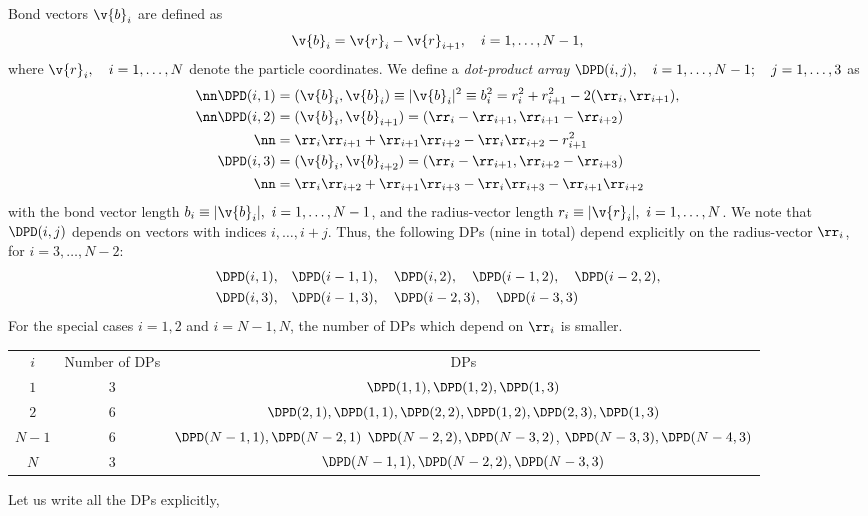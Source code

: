Bond vectors $\v{b}_i$ are defined as 
\begin{equation}
  \v{b}_i=\v{r}_i-\v{r}_{i+1},\quad i=1,\ldots,N-1,
  \label{bln-def-bv}
\end{equation}
where $\v{r}_i,\quad i=1,\ldots,N$ denote the particle coordinates. We define
a \emph{dot-product array} $\DPD(i,j),\quad i=1,\ldots, N-1;\quad j=1,\ldots,3$ as
\begin{align}
  \nn\DPD(i,1)&=(\v{b}_i,\v{b}_i)\equiv |\v{b}_i|^2\equiv b_i^2=r_i^2+r_{i+1}^2-2(\rr_i,\rr_{i+1}),\\
  \nn\DPD(i,2)&=(\v{b}_i,\v{b}_{i+1})=(\rr_i-\rr_{i+1},\rr_{i+1}-\rr_{i+2})\\
\nn&=\rr_i\rr_{i+1}+\rr_{i+1}\rr_{i+2}-\rr_i\rr_{i+2}-r_{i+1}^2\\
  \DPD(i,3)&=(\v{b}_i,\v{b}_{i+2})=(\rr_i-\rr_{i+1},\rr_{i+2}-\rr_{i+3})\\
\nn&=\rr_i\rr_{i+2}+\rr_{i+1}\rr_{i+3}-\rr_{i}\rr_{i+3}-\rr_{i+1}\rr_{i+2}
  \label{bln-def-dpd}
\end{align}
with the bond vector length $b_i\equiv|\v{b}_i|,\ i=1,\ldots,N-1$, 
and the radius-vector length $r_i\equiv|\v{r}_i|,\ i=1,\ldots,N$.
We note that $\DPD(i,j)$ depends on vectors with indices $i,\ldots,i+j$. Thus,
the following DPs (nine in total) depend explicitly on the radius-vector $\rr_i$, for $i=3,\ldots,N-2$:
\begin{align*}
 \DPD(i,1),&\quad\DPD(i-1,1),\quad\DPD(i,2),\quad\DPD(i-1,2),\quad\DPD(i-2,2),\\ 
 \DPD(i,3),&\quad\DPD(i-1,3),\quad\DPD(i-2,3),\quad\DPD(i-3,3)
\end{align*}
For the special cases $i=1,2$ and $i=N-1,N$, the number of DPs which 
depend on $\rr_i$ is smaller. 
\begin{table}
  \centering
  \begin{tabular}{ccc}
   $i$ 		& Number of DPs		&	DPs \\ 
   $1$		& 3			&	$\DPD(1,1),\DPD(1,2),\DPD(1,3)$ \\
   $2$		& 6			&	$\DPD(2,1),\DPD(1,1),\DPD(2,2),\DPD(1,2),\DPD(2,3),\DPD(1,3)$ \\
   $N-1$	& 6			&	$\DPD(N-1,1),\DPD(N-2,1)$
						$\DPD(N-2,2),\DPD(N-3,2)$,
						$\DPD(N-3,3),\DPD(N-4,3)$	\\	
   $N$		& 3			&	$\DPD(N-1,1),\DPD(N-2,2),\DPD(N-3,3)$ \\
  \end{tabular}
\end{table}
Let us write all the DPs explicitly,
